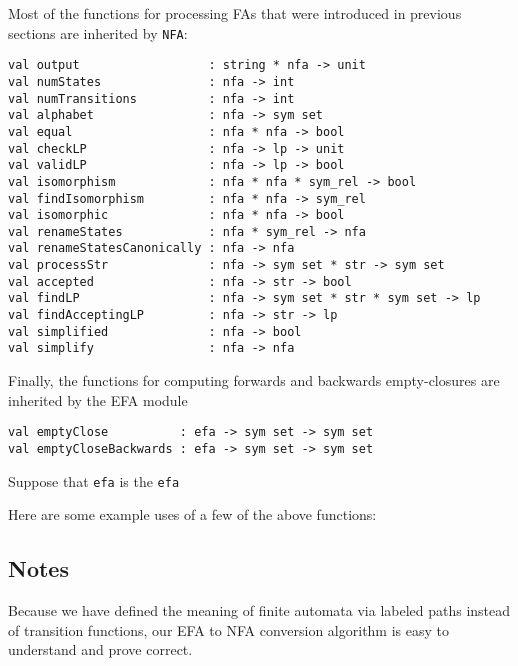 Most of the functions for processing FAs that were introduced
in previous sections are inherited by \texttt{NFA}:
\begin{verbatim}
val output                  : string * nfa -> unit 
val numStates               : nfa -> int
val numTransitions          : nfa -> int
val alphabet                : nfa -> sym set
val equal                   : nfa * nfa -> bool
val checkLP                 : nfa -> lp -> unit
val validLP                 : nfa -> lp -> bool
val isomorphism             : nfa * nfa * sym_rel -> bool
val findIsomorphism         : nfa * nfa -> sym_rel
val isomorphic              : nfa * nfa -> bool
val renameStates            : nfa * sym_rel -> nfa
val renameStatesCanonically : nfa -> nfa
val processStr              : nfa -> sym set * str -> sym set
val accepted                : nfa -> str -> bool
val findLP                  : nfa -> sym set * str * sym set -> lp
val findAcceptingLP         : nfa -> str -> lp
val simplified              : nfa -> bool
val simplify                : nfa -> nfa
\end{verbatim}
Finally, the functions for computing forwards and backwards
empty-closures are inherited by the EFA module
\begin{verbatim}
val emptyClose          : efa -> sym set -> sym set
val emptyCloseBackwards : efa -> sym set -> sym set
\end{verbatim}

Suppose that \texttt{efa} is the \texttt{efa}
\begin{center}

\end{center}
Here are some example uses of a few of the above functions:


\subsection{Notes}

Because we have defined the meaning of finite automata via labeled
paths instead of transition functions, our EFA to NFA conversion algorithm
is easy to understand and prove correct.

